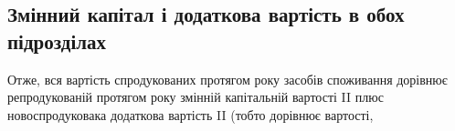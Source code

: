\subsection{Змінний капітал і додаткова вартість в обох підрозділах}

Отже, вся вартість спродукованих протягом року засобів споживання
дорівнює репродукованій протягом року змінній капітальній вартості II
плюс новоспродуковака додаткова вартість II (тобто дорівнює вартості,
\parbreak{}  %

